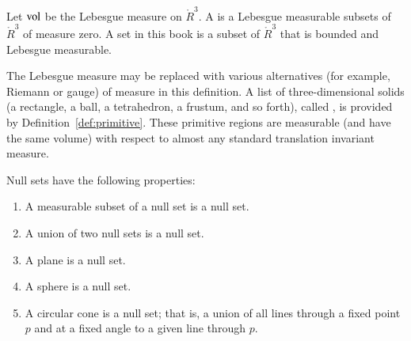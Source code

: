 
\begin{definition}
Let ${\operatorname{vol}}$ be the Lebesgue measure
on $\ring{R}^3$. 
A  is a 
Lebesgue measurable subsets of $\ring{R}^3$ of measure zero.
A  set in this book is a subset of $\ring{R}^3$ that
is bounded and Lebesgue measurable.
\end{definition}
%
%

\begin{remark}[]
  The Lebesgue measure may be replaced with various alternatives (for
  example, Riemann or gauge) of measure in this definition.  A list of
  three-dimensional solids (a rectangle, a ball, a tetrahedron, a
  frustum, and so forth), called , is
  provided by Definition~\ref{def:primitive}.  These primitive regions
  are measurable (and have the same volume) with respect to almost any
  standard translation invariant measure.
\end{remark}

\begin{lemma}\label{lemma:null}
Null sets have the following  properties:
\begin{enumerate}%
\item A measurable subset of a null set is a null set.
\item A union of two null sets is a null set.
\item A plane is a null set.
\item A sphere is a null set.
\item A circular cone is a null set; that is, a union of all
lines through a fixed point $p$ and at
a fixed angle to a given line through $p$.
\label{enum:null}
%
%
%
%
\end{enumerate}
\end{lemma}
%

%




